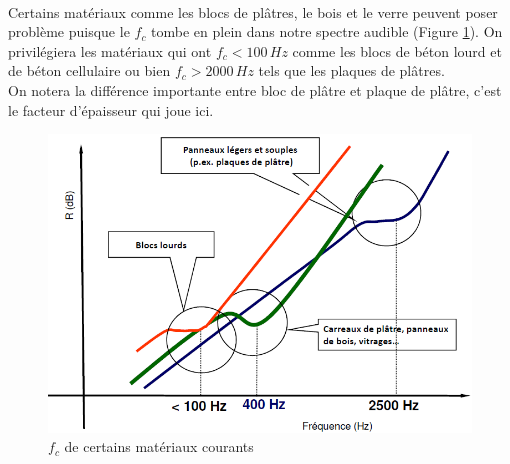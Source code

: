 \documentclass[11pt]{report}
\begin{document}
\\

\vspace{5mm}
Certains matériaux comme les blocs de plâtres, le bois et le verre peuvent poser problème puisque le $f_c$ tombe en plein dans notre spectre audible (Figure \ref{fc}). On privilégiera les matériaux qui ont $f_c<100 \,Hz$ comme les blocs de béton lourd et de béton cellulaire ou bien $f_c>2000\,Hz$ tels que les plaques de plâtres.\\

On notera la différence importante entre bloc de plâtre et plaque de plâtre, c'est le facteur d'épaisseur qui joue ici.


\begin{figure}[ht]
\begin{center}
\includegraphics[width=0.6\linewidth]{fc}
\caption{$f_c$ de certains matériaux courants}
\label{fc}
\end{center}
\end{figure}
\end{document}
